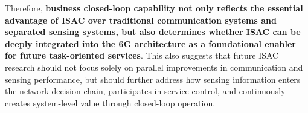 Therefore, \textbf{business closed-loop capability not only reflects the essential advantage of ISAC over traditional communication systems and separated sensing systems, but also determines whether ISAC can be deeply integrated into the 6G architecture as a foundational enabler for future task-oriented services}. This also suggests that future ISAC research should not focus solely on parallel improvements in communication and sensing performance, but should further address how sensing information enters the network decision chain, participates in service control, and continuously creates system-level value through closed-loop operation.